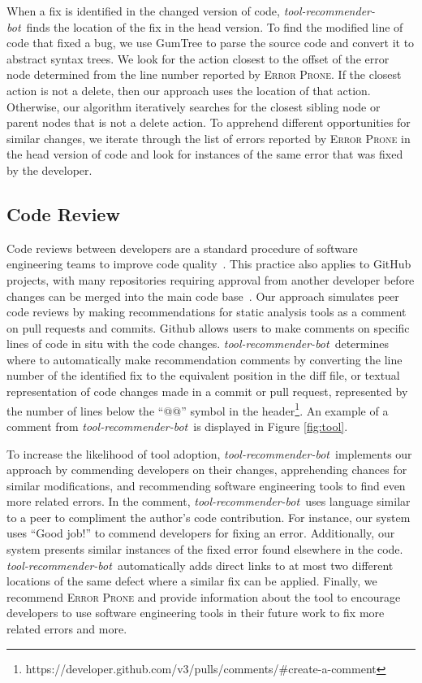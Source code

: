 \documentclass[sigconf,review,anonymous]{acmart}
\newcommand{\tool}{\textsl{tool-recommender-bot}}
\begin{document}
When a fix is identified in the changed version of code, \tool~finds the location of the fix in the head version. To find the modified line of code that fixed a bug, we use GumTree to parse the source code and convert it to abstract syntax trees. We look for the action closest to the offset of the error node determined from the line number reported by \textsc{Error Prone}. If the closest action is not a delete, then our approach uses the location of that action. Otherwise, our algorithm iteratively searches for the closest sibling node or parent nodes that is not a delete action. To apprehend different opportunities for similar changes, we iterate through the list of errors reported by \textsc{Error Prone} in the head version of code and look for instances of the same error that was fixed by the developer.

\subsection{Code Review}

Code reviews between developers are a standard procedure of software engineering teams to improve code quality~\cite{CodeReviewingTrenches}. This practice also applies to GitHub projects, with many repositories requiring approval from another developer before changes can be merged into the main code base~\cite{PullRequestReview}. Our approach simulates peer code reviews by making recommendations for static analysis tools as a comment on pull requests and commits. Github allows users to make comments on specific lines of code in situ with the code changes. \tool~determines where to automatically make recommendation comments by converting the line number of the identified fix to the equivalent position in the diff file, or textual representation of code changes made in a commit or pull request, represented by the number of lines below the ``@@'' symbol in the header\footnote{https://developer.github.com/v3/pulls/comments/\#create-a-comment}. An example of a comment from \tool~is displayed in Figure \ref{fig:tool}.

To increase the likelihood of tool adoption, \tool~implements our approach by commending developers on their changes, apprehending chances for similar modifications, and recommending software engineering tools to find even more related errors. In the comment, \tool~uses language similar to a peer to compliment the author's code contribution. For instance, our system uses ``Good job!'' to commend developers for fixing an error. Additionally, our system presents similar instances of the fixed error found elsewhere in the code.  \tool~automatically adds direct links to at most two different locations of the same defect where a similar fix can be applied. Finally, we recommend \textsc{Error Prone} and provide information about the tool to encourage developers to use software engineering tools in their future work to fix more related errors and more.
\end{document}
